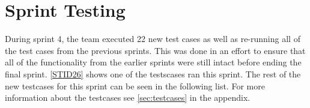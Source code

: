 

\section{Sprint Testing}
\label{sec:sp4test}

During sprint 4, the team executed 22 new test cases as well as re-running all of the test cases from the previous sprints. This was done in an effort to ensure that all of the functionality from the earlier sprints were still intact before ending the final sprint. \autoref{STID26} shows one of the testscases ran this sprint. The rest of the new testcases for this sprint can be seen in the following list. For more information about the testcases see \autoref{sec:testcases} in the appendix.

